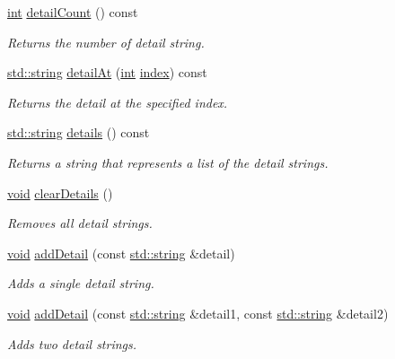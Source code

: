 \begin{DoxyCompactItemize}
\hyperlink{wglew_8h_a500a82aecba06f4550f6849b8099ca21}{int} \hyperlink{class_message_a312fc09ce16cb1414a0efd2458defc21}{detail\-Count} () const 
\begin{DoxyCompactList}\small\item\em Returns the number of detail string. \end{DoxyCompactList}\item 
\hyperlink{glew_8h_ae84541b4f3d8e1ea24ec0f466a8c568b}{std\-::string} \hyperlink{class_message_ad2fea61f003bfbe810ce8149f2faf6a2}{detail\-At} (\hyperlink{wglew_8h_a500a82aecba06f4550f6849b8099ca21}{int} \hyperlink{fmod__codec_8h_a57f14e05b1900f16a2da82ade47d0c6d}{index}) const 
\begin{DoxyCompactList}\small\item\em Returns the detail at the specified index. \end{DoxyCompactList}\item 
\hyperlink{glew_8h_ae84541b4f3d8e1ea24ec0f466a8c568b}{std\-::string} \hyperlink{class_message_aacec5052940b4e18a35bb3f363f05cc4}{details} () const 
\begin{DoxyCompactList}\small\item\em Returns a string that represents a list of the detail strings. \end{DoxyCompactList}\item 
\hyperlink{wglew_8h_aeea6e3dfae3acf232096f57d2d57f084}{void} \hyperlink{class_message_af5a1d2f3def9208bb603587f79c5d711}{clear\-Details} ()
\begin{DoxyCompactList}\small\item\em Removes all detail strings. \end{DoxyCompactList}\item 
\hyperlink{wglew_8h_aeea6e3dfae3acf232096f57d2d57f084}{void} \hyperlink{class_message_a7cc56c24bc9d7516247cd865c472ab2f}{add\-Detail} (const \hyperlink{glew_8h_ae84541b4f3d8e1ea24ec0f466a8c568b}{std\-::string} \&detail)
\begin{DoxyCompactList}\small\item\em Adds a single detail string. \end{DoxyCompactList}\item 
\hyperlink{wglew_8h_aeea6e3dfae3acf232096f57d2d57f084}{void} \hyperlink{class_message_a2c67e0d82c3b4e3f3d21cec40537d6de}{add\-Detail} (const \hyperlink{glew_8h_ae84541b4f3d8e1ea24ec0f466a8c568b}{std\-::string} \&detail1, const \hyperlink{glew_8h_ae84541b4f3d8e1ea24ec0f466a8c568b}{std\-::string} \&detail2)
\begin{DoxyCompactList}\small\item\em Adds two detail strings. \end{DoxyCompactList}\item 

\end{DoxyCompactItemize}
